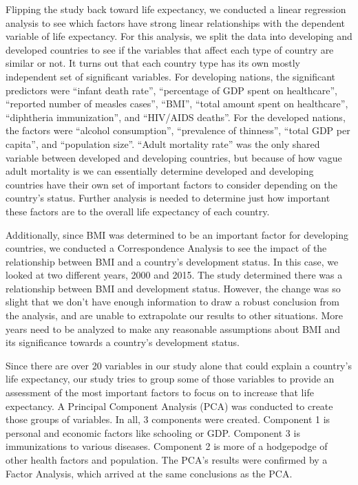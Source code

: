 \documentclass[12pt]{article}
\begin{document}
Flipping the study back toward life expectancy, we conducted a linear regression analysis to see which factors have strong linear relationships with the dependent variable of life expectancy. For this analysis, we split the data into developing and developed countries to see if the variables that affect each type of country are similar or not. It turns out that each country type has its own mostly independent set of significant variables. For developing nations, the significant predictors were “infant death rate”, “percentage of GDP spent on healthcare”, “reported number of measles cases”, “BMI”, “total amount spent on healthcare”, “diphtheria immunization”, and “HIV/AIDS deaths”. For the developed nations, the factors were “alcohol consumption”, “prevalence of thinness”, “total GDP per capita”, and “population size”. “Adult mortality rate” was the only shared variable between developed and developing countries, but because of how vague adult mortality is we can essentially determine developed and developing countries have their own set of important factors to consider depending on the country’s status. Further analysis is needed to determine just how important these factors are to the overall life expectancy of each country.

Additionally, since BMI was determined to be an important factor for developing countries, we conducted a Correspondence Analysis to see the impact of the relationship between BMI and a country’s development status. In this case, we looked at two different years, 2000 and 2015. The study determined there was a relationship between BMI and development status. However, the change was so slight that we don’t have enough information to draw a robust conclusion from the analysis, and are unable to extrapolate our results to other situations. More years need to be analyzed to make any reasonable assumptions about BMI and its significance towards a country’s development status. 

Since there are over 20 variables in our study alone that could explain a country’s life expectancy, our study tries to group some of those variables to provide an assessment of the most important factors to focus on to increase that life expectancy. A Principal Component Analysis (PCA) was conducted to create those groups of variables. In all, 3 components were created. Component 1 is personal and economic factors like schooling or GDP. Component 3 is immunizations to various diseases. Component 2 is more of a hodgepodge of other health factors and population. The PCA’s results were confirmed by a Factor Analysis, which arrived at the same conclusions as the PCA.
\end{document}
